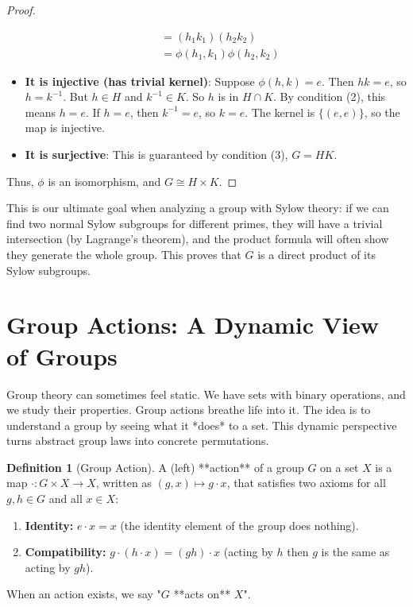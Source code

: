 \documentclass[12pt,a4paper]{article}
\theoremstyle{plain} %
\theoremstyle{definition} %
\newtheorem{definition}[theorem]{Definition}
\theoremstyle{remark} %
\begin{document}
\begin{proof}
\begin{itemize}
\begin{align*}
                              &= (h_1k_1)(h_2k_2) \\
                              &= \phi(h_1,k_1)\phi(h_2,k_2)
    \end{align*}
    \item \textbf{It is injective (has trivial kernel)}: Suppose $\phi(h,k)=e$. Then $hk=e$, so $h=k^{-1}$. But $h \in H$ and $k^{-1} \in K$. So $h$ is in $H \cap K$. By condition (2), this means $h=e$. If $h=e$, then $k^{-1}=e$, so $k=e$. The kernel is $\{(e,e)\}$, so the map is injective.
    \item \textbf{It is surjective}: This is guaranteed by condition (3), $G=HK$.
\end{itemize}
Thus, $\phi$ is an isomorphism, and $G \cong H \times K$.
\end{proof}

This is our ultimate goal when analyzing a group with Sylow theory: if we can find two normal Sylow subgroups for different primes, they will have a trivial intersection (by Lagrange's theorem), and the product formula will often show they generate the whole group. This proves that $G$ is a direct product of its Sylow subgroups.

\newpage
\section{Group Actions: A Dynamic View of Groups}

Group theory can sometimes feel static. We have sets with binary operations, and we study their properties. Group actions breathe life into it. The idea is to understand a group by seeing what it *does* to a set. This dynamic perspective turns abstract group laws into concrete permutations.

\begin{definition}[Group Action]
A (left) **action** of a group $G$ on a set $X$ is a map $\cdot: G \times X \to X$, written as $(g,x) \mapsto g \cdot x$, that satisfies two axioms for all $g, h \in G$ and all $x \in X$:
\begin{enumerate}
    \item \textbf{Identity:} $e \cdot x = x$ (the identity element of the group does nothing).
    \item \textbf{Compatibility:} $g \cdot (h \cdot x) = (gh) \cdot x$ (acting by $h$ then $g$ is the same as acting by $gh$).
\end{enumerate}
When an action exists, we say "$G$ **acts on** $X$".
\end{definition}
\end{document}
